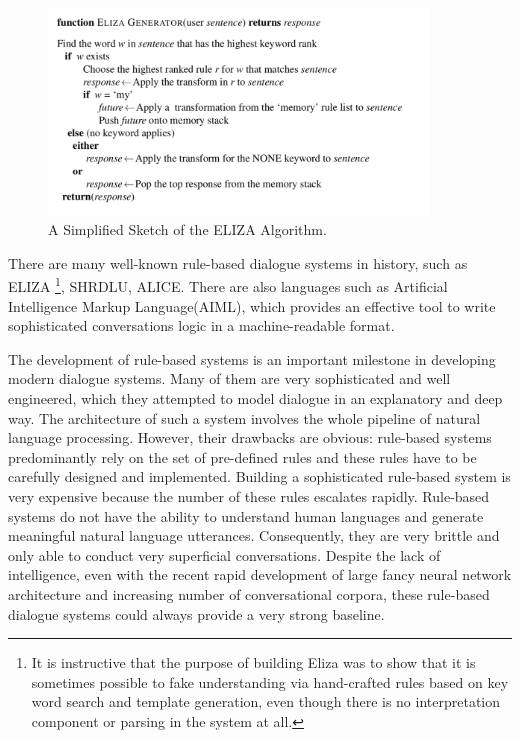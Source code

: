 \documentclass[bsc,frontabs,twoside,singlespacing,parskip,deptreport]{infthesis}     %
\begin{document}
\begin{figure}[h]
    \centering
    \includegraphics[width=0.9\textwidth]{elizarule.jpeg}
    \caption{A Simplified Sketch of the ELIZA Algorithm.}
    \label{fig:elizarule}
\end{figure}

There are many well-known rule-based dialogue systems in history, such as ELIZA\cite{weizenbaum1966eliza} \footnote{It is instructive that the purpose of building Eliza was to show that it is sometimes possible to fake understanding via hand-crafted rules based on key word search and template generation, even though there is no interpretation component or parsing in the system at all.}, SHRDLU\cite{winograd1972shrdlu}, ALICE\cite{wallace1995artificial}. There are also languages such as Artificial Intelligence Markup Language(AIML), which provides an effective tool to write sophisticated conversations logic in a machine-readable format\cite{wallace1995artificial}.

The development of rule-based systems is an important milestone in developing modern dialogue systems. Many of them are very sophisticated and well engineered, which they attempted to model dialogue in an explanatory and deep way. The architecture of such a system involves the whole pipeline of natural language processing. However, their drawbacks are obvious: rule-based systems predominantly rely on the set of pre-defined rules and these rules have to be carefully designed and implemented. Building a sophisticated rule-based system is very expensive because the number of these rules escalates rapidly. Rule-based systems do not have the ability to understand human languages and generate meaningful natural language utterances\cite{jiweilithesis}. Consequently, they are very brittle and only able to conduct very superficial conversations. Despite the lack of intelligence, even with the recent rapid development of large fancy neural network architecture and increasing number of conversational corpora, these rule-based dialogue systems could always provide a very strong baseline.
\end{document}
